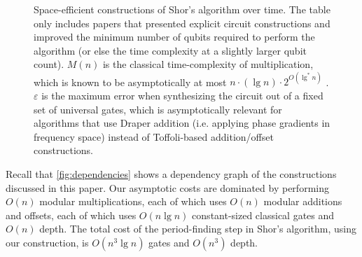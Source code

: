 \documentclass[twocolumn,longbibliography]{quantumarticle-customized}
\begin{document}
\begin{figure}
  \centering
  \caption{
    Space-efficient constructions of Shor's algorithm over time.
    The table only includes papers that presented explicit circuit constructions and improved the minimum number of qubits required to perform the algorithm (or else the time complexity at a slightly larger qubit count).
    $M(n)$ is the classical time-complexity of multiplication, which is known to be asymptotically at most $n \cdot (\lg n) \cdot 2^{O(\lg^* n)}$ \cite{furer2007}.
    $\varepsilon$ is the maximum error when synthesizing the circuit out of a fixed set of universal gates, which is asymptotically relevant for algorithms that use Draper addition \cite{draper2000} (i.e. applying phase gradients in frequency space) instead of Toffoli-based addition/offset constructions.
  }
  \label{fig:table-over-time}
\end{figure}


Recall that \autoref{fig:dependencies} shows a dependency graph of the constructions discussed in this paper.
Our asymptotic costs are dominated by performing $O(n)$ modular multiplications, each of which uses $O(n)$ modular additions and offsets, each of which uses $O(n \lg n)$ constant-sized classical gates \cite{haner2016} and $O(n)$ depth.
The total cost of the period-finding step in Shor's algorithm, using our construction, is $O(n^3 \lg n)$ gates and $O(n^3)$ depth.
\end{document}
